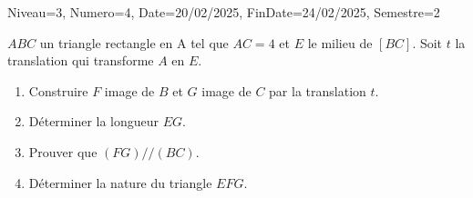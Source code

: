 \documentclass[a4paper,12pt]{article}
\begin{document}
\begin{Maquette}[DM]{Niveau=3, Numero=4, Date=20/02/2025, FinDate=24/02/2025, Semestre=2}
\begin{exercice}
$ABC$ un triangle rectangle en A tel que $AC=4 $ et $E$ le milieu de $[BC]$. Soit $t$ la translation qui transforme $A$ en $E$.
\begin{enumerate}
\item Construire $F$ image de $B$ et $G$ image de $C$ par la translation $t$.
\item Déterminer la longueur $EG$.
\item Prouver que $(FG)//(BC)$.
\item Déterminer la nature du triangle $EFG$. 
\end{enumerate}
\end{exercice}

\end{Maquette}
\end{document}
